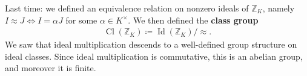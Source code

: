 \begin{remark}

Last time: we defined an equivalence relation on nonzero ideals of
\({\mathbb{Z}}_K\), namely \(I \approx J \iff I = \alpha J\) for some
\(\alpha \in K^{\times}\). We then defined the \textbf{class group}
\begin{align*}
\operatorname{Cl}({\mathbb{Z}}_K) \coloneqq\operatorname{Id}({\mathbb{Z}}_K) / \approx
.\end{align*}
We saw that ideal multiplication descends to a well-defined group
structure on ideal classes. Since ideal multiplication is commutative,
this is an abelian group, and moreover it is finite.

\end{remark}

\begin{example}


\end{example}
